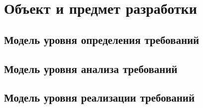 \section{Объект и предмет разработки}
\subsection{Модель уровня определения требований}
\subsection{Модель уровня анализа требований}
\subsection{Модель уровня реализации требований}